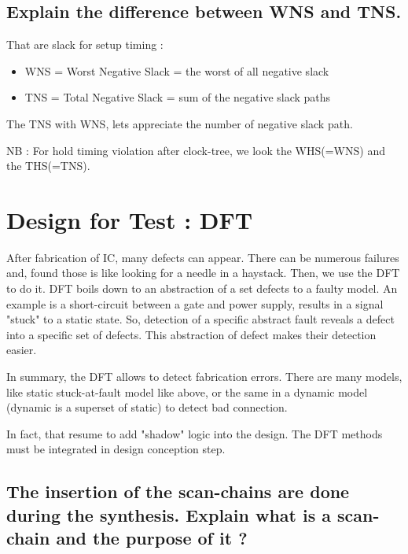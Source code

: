 \documentclass[11pt,a4paper,sans,dvipsnames]{report}
\begin{document}
	\subsection*{Explain the difference between WNS and TNS.}

	That are slack for setup timing :
	\begin{itemize}
		\item WNS = Worst Negative Slack = the worst of all negative slack
		\item TNS = Total Negative Slack = sum of the negative slack paths
	\end{itemize}
	The TNS with WNS, lets appreciate the number of negative slack path.

	NB : For hold timing violation after clock-tree, we look the WHS(=WNS) and the THS(=TNS).




	\newpage
	\section{Design for Test : DFT}

	After fabrication of IC, many defects can appear. There can be numerous failures and, found those is like looking for a needle in a haystack. Then, we use the DFT to do it. 
	DFT boils down to an abstraction of a set defects to a faulty model.
	An example is a short-circuit between a gate and power supply, results in a signal "stuck" to a static state. So, detection of a specific abstract fault reveals a defect into a specific set of defects.
	This abstraction of defect makes their detection easier.

	In summary, the DFT allows to detect fabrication errors.
	There are many models, like static stuck-at-fault model like above, or the same in a dynamic model (dynamic is a superset of static) to detect bad connection.

	In fact, that resume to add "shadow" logic into the design. The DFT methods must be integrated in design conception step.

	\subsection*{The insertion of the scan-chains are done during the synthesis. Explain what is a scan-chain and the purpose of it ?}
\end{document}
